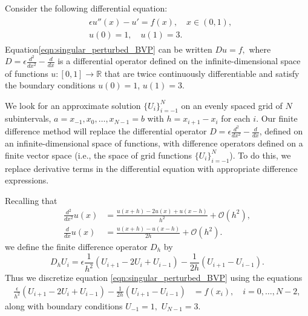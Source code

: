 Consider the following differential equation:
\begin{align}
	\begin{split}
	&{ } \epsilon u''(x)-u'= f(x), \quad x \in (0,1), \\
	&{ } u(0) = 1, \quad u(1) = 3.
	\end{split} \label{eqn:singular_perturbed_BVP}
\end{align}
Equation\eqref{eqn:singular_perturbed_BVP} can be written $D u = f,$ where $D = \epsilon \frac{d^2}{dx^2} - \frac{d}{dx}$ is a differential operator defined on the infinite-dimensional space of functions $u:[0,1] \to \mathbb{R}$ that are twice continuously differentiable and satisfy the boundary conditions $u(0) = 1$, $u(1) = 3$.

We look for an approximate solution $\{U_i\}_{i=-1}^N$ on an evenly spaced grid of $N$ subintervals, $a = x_{-1}, x_0, \ldots, x_{N-1} = b$ with $h = x_{i+1}-x_i$ for each $i$.
Our finite difference method will replace the differential operator $D = \epsilon \frac{d^2}{dx^2} - \frac{d}{dx}$, defined on an infinite-dimensional space of functions, with difference operators defined on a finite vector space (i.e., the space of grid functions $\{U_i\}_{i=-1}^N$).
To do this, we replace derivative terms in the differential equation with appropriate difference expressions.

Recalling that
\begin{align*}
	\frac{d^2}{dx^2} u(x) &= \frac{u(x+h)- 2u(x) + u(x-h)}{h^2} + \mathcal{O}(h^2),\\
\frac{d}{dx} u(x) &= \frac{u(x+h)-u(x-h)}{2h} + \mathcal{O}(h^2).
\end{align*}
we define the finite difference operator $D_h$ by
\[
D_h U_i = \epsilon \frac{1}{h^2}\left(U_{i+1} -2U_i + U_{i-1}\right) - \frac{1}{2h} \left(U_{i+1}-U_{i-1} \right).
\]
Thus we discretize equation \eqref{eqn:singular_perturbed_BVP} using the equations
\begin{align*}
	\frac{\epsilon}{h^2} (U_{i+1}- 2U_i + U_{i-1}) - \frac{1}{2h} \left(U_{i+1}-U_{i-1} \right)  &= f(x_i), \quad i = 0, \ldots, N-2,
\end{align*}
along with boundary conditions $U_{-1} = 1,$ $U_{N-1} = 3$.


